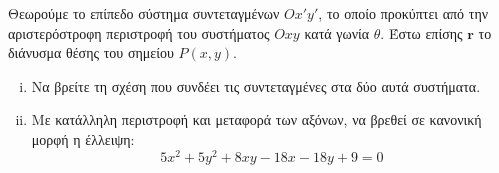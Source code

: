 \documentclass[a4paper,table]{report}
\begin{document}
\begin{mybox3}
  \begin{thema}
        Θεωρούμε το επίπεδο σύστημα συντεταγμένων $ Ox'y' $, το οποίο προκύπτει από την 
        αριστερόστροφη περιστροφή του συστήματος $ Oxy $ κατά γωνία $\theta$. 
        Έστω επίσης $ \mathbf{r} $ το διάνυσμα θέσης του σημείου $ P(x,y) $. 
    \begin{enumerate}[i)]
      \item Να βρείτε τη σχέση που συνδέει τις συντεταγμένες στα δύο αυτά συστήματα.
      \item Με κατάλληλη περιστροφή και μεταφορά των αξόνων, να βρεθεί σε κανονική μορφή 
        η έλλειψη:
        \[
          5x^{2} + 5y^{2} + 8xy - 18x - 18y +9 = 0
        \] 
    \end{enumerate}
  \end{thema}
\end{mybox3}
\end{document}
